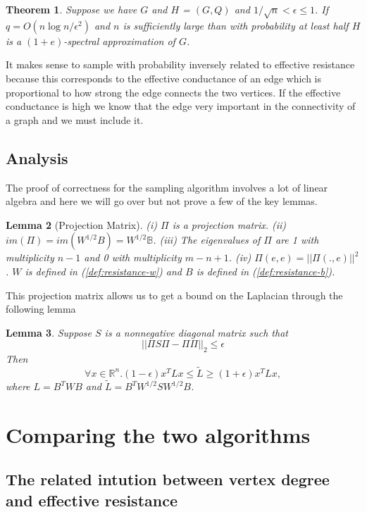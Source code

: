 \documentclass[12pt,twoside]{article}
\newtheorem{thm}{Theorem}
\newtheorem{lemma}[thm]{Lemma}
\begin{document}
\begin{thm}
Suppose we have $G$ and $H$ = $(G, Q)$ and $1/\sqrt{n} < \epsilon \leq 1$. If $q=O(n\log n /\epsilon^2)$ and $n$ is sufficiently large than with probability at least half $H$ is a $(1+e)$-spectral approximation of $G$.
\end{thm}

It makes sense to sample with probability inversely related to effective resistance because this corresponds to the effective conductance of an edge which is proportional to how strong the edge connects the two vertices. If the effective conductance is high we know that the edge very important in the connectivity of a graph and we must include it. 

\subsection{Analysis}

The proof of correctness for the sampling algorithm involves a lot of linear algebra and here we will go over but not prove a few of the key lemmas. 

\begin{lemma}[Projection Matrix]
(i) $\Pi$ is a projection matrix. (ii) $im(\Pi) = im(W^{1/2}B) = W^{1/2} \mathbb{B}$. (iii) The eigenvalues of $\Pi$ are 1 with multiplicity $n-1$ and 0 with multiplicity $m-n+1$. (iv) $\Pi(e,e) = ||\Pi(.,e)||^2$. $W$ is defined in  (\ref{def:resistance-w}) and $B$ is defined in (\ref{def:resistance-b}). 
\end{lemma}

This projection matrix allows us to get a bound on the Laplacian through the following lemma

\begin{lemma}
Suppose $S$ is a nonnegative diagonal matrix such that 
$$
||\Pi S \Pi - \Pi \Pi ||_2 \leq \epsilon
$$
Then 
$$
\forall x \in \mathbb{R}^n. (1-\epsilon)x^T L x \leq \tilde{L} \geq (1+\epsilon)x^T L x,
$$
where $L=B^TWB$ and $\tilde{L}=B^T W^{1/2} S W^{1/2} B$.
\end{lemma}


\section{Comparing the two algorithms}

\subsection{The related intution between vertex degree and effective resistance}
\end{document}
